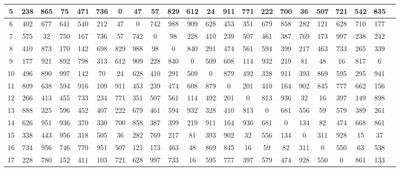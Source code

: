 \documentclass[a4paper, 12pt]{book}
\begin{document}
\begin{appendices}
\begin{table}[h]
\begin{center}
\begin{tabulary}{1.0\textwidth}{
       | C | C | C | C | C | C | C | C | C | C | C | C | C | C | C | C | C | C | C | C | C | C |
    }
5 & 238 & 865 & 75 & 471 & 736 & 0 & 47 & 57 & 829 & 612 & 24 & 911 & 771 & 222 & 700 & 36 & 507 & 721 & 542 & 835 \\ \hline

6 & 402 & 677 & 641 & 540 & 212 & 47 & 0 & 742 & 988 & 909 & 628 & 453 & 351 & 679 & 858 & 282 & 121 & 628 & 710 & 177 \\ \hline

7 & 575 & 32 & 750 & 167 & 736 & 57 & 742 & 0 & 98 & 228 & 410 & 239 & 507 & 461 & 387 & 769 & 173 & 997 & 238 & 242 \\ \hline

8 & 410 & 873 & 170 & 142 & 698 & 829 & 988 & 98 & 0 & 840 & 291 & 474 & 561 & 594 & 399 & 217 & 463 & 733 & 265 & 339 \\ \hline

9 & 177 & 921 & 892 & 798 & 313 & 612 & 909 & 228 & 840 & 0 & 509 & 608 & 114 & 932 & 219 & 81 & 48 & 16 & 817 & 6 \\ \hline

10 & 496 & 890 & 997 & 142 & 70 & 24 & 628 & 410 & 291 & 509 & 0 & 879 & 492 & 328 & 911 & 393 & 869 & 595 & 295 & 941 \\ \hline

11 & 809 & 638 & 594 & 916 & 109 & 911 & 453 & 239 & 474 & 608 & 879 & 0 & 201 & 410 & 164 & 902 & 845 & 777 & 662 & 156 \\ \hline

12 & 266 & 413 & 455 & 733 & 234 & 771 & 351 & 507 & 561 & 114 & 492 & 201 & 0 & 813 & 936 & 32 & 16 & 397 & 149 & 898 \\ \hline

13 & 888 & 325 & 596 & 452 & 407 & 222 & 679 & 461 & 594 & 932 & 328 & 410 & 813 & 0 & 681 & 556 & 59 & 579 & 389 & 261 \\ \hline

14 & 626 & 951 & 936 & 370 & 330 & 700 & 858 & 387 & 399 & 219 & 911 & 164 & 936 & 681 & 0 & 134 & 82 & 474 & 668 & 861 \\ \hline

15 & 338 & 443 & 956 & 318 & 505 & 36 & 282 & 769 & 217 & 81 & 393 & 902 & 32 & 556 & 134 & 0 & 311 & 928 & 15 & 37 \\ \hline

16 & 734 & 956 & 746 & 770 & 951 & 507 & 121 & 173 & 463 & 48 & 869 & 845 & 16 & 59 & 82 & 311 & 0 & 550 & 63 & 538 \\ \hline

17 & 228 & 780 & 152 & 411 & 103 & 721 & 628 & 997 & 733 & 16 & 595 & 777 & 397 & 579 & 474 & 928 & 550 & 0 & 861 & 133 \\ \hline


\end{tabulary}
\end{center}
\end{table}
\end{appendices}
\end{document}

